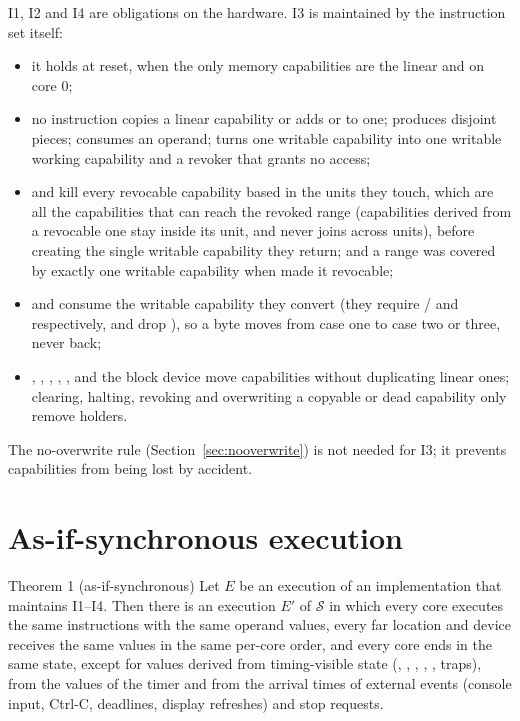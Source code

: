 I1, I2 and I4 are obligations on the hardware. I3 is maintained by the instruction set itself:
\begin{itemize}
\item it holds at reset, when the only memory capabilities are the linear  and  on core 0;
\item no instruction copies a linear capability or adds  or  to one; 
  produces disjoint pieces;  consumes an operand;  turns one writable
  capability into one writable working capability and a revoker that grants no access;
\item {} and  kill every revocable capability based in the units they touch,
  which are all the capabilities that can reach the revoked range (capabilities derived from a
  revocable one stay inside its unit, and  never joins across units), before creating
  the single writable capability they return; and a range was covered by exactly one writable
  capability when  made it revocable;
\item {} and  consume the writable capability they convert (they require
  / and  respectively, and drop ), so a byte moves from case one to case
  two or three, never back;
\item {}, , , , ,  and the
  block device move capabilities without duplicating linear ones; clearing, halting, revoking and
  overwriting a copyable or dead capability only remove holders.
\end{itemize}
The no-overwrite rule (Section~\ref{sec:nooverwrite}) is not needed for I3; it prevents capabilities
from being lost by accident.

\section{As-if-synchronous execution}

\begin{rule*}{Theorem 1 (as-if-synchronous)}
Let $E$ be an execution of an implementation that maintains I1--I4. Then there is an execution $E'$ of
$\mathcal{S}$ in which every core executes the same instructions with the same operand values, every
far location and device receives the same values in the same per-core order, and every core ends in
the same state, except for values derived from timing-visible state (, ,
, , ,  traps), from the values of the timer and from
the arrival times of external events (console input, Ctrl-C, deadlines, display refreshes) and stop
requests.
\end{rule*}

